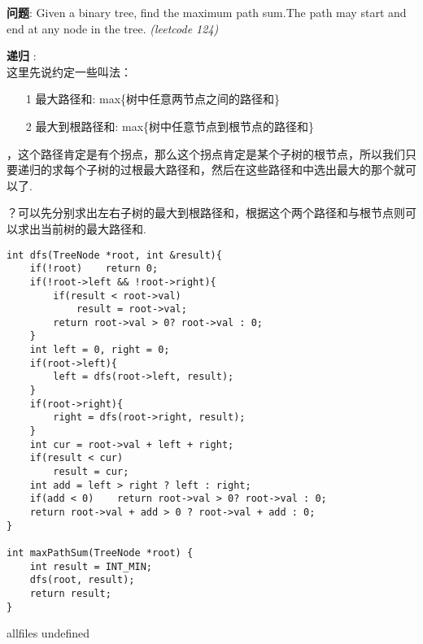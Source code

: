 \documentclass{article}
\begin{document}
\begin{CJK}{UTF8}{gbsn}     %

\else
    
\begin{description}
    \item{\textbf{问题}}: Given a binary tree, find the maximum path sum.The path may start and end at any node in the tree. \textit{(leetcode 124)}
    \item{\textbf{递归}} : 
    \\这里先说约定一些叫法：
    \begin{itemize}
    \item[1] 最大路径和: max\{树中任意两节点之间的路径和\}
    \item[2] 最大到根路径和: max\{树中任意节点到根节点的路径和\}
    \end{itemize}
    ，这个路径肯定是有个拐点，那么这个拐点肯定是某个子树的根节点，所以我们只要递归的求每个子树的过根最大路径和，然后在这些路径和中选出最大的那个就可以了.
    
    ？可以先分别求出左右子树的最大到根路径和，根据这个两个路径和与根节点则可以求出当前树的最大路径和.
    \begin{lstlisting}
int dfs(TreeNode *root, int &result){
    if(!root)    return 0;
    if(!root->left && !root->right){
        if(result < root->val)
            result = root->val;
        return root->val > 0? root->val : 0;
    }
    int left = 0, right = 0;
    if(root->left){
        left = dfs(root->left, result);
    }
    if(root->right){
        right = dfs(root->right, result);
    }
    int cur = root->val + left + right;
    if(result < cur)
        result = cur;
    int add = left > right ? left : right;
    if(add < 0)    return root->val > 0? root->val : 0;
    return root->val + add > 0 ? root->val + add : 0;
}

int maxPathSum(TreeNode *root) {
    int result = INT_MIN;
    dfs(root, result);
    return result;
}
    \end{lstlisting}
    \textit{}
\end{description}

\fi

\ifx allfiles undefined
\end{CJK}
\end{document}
